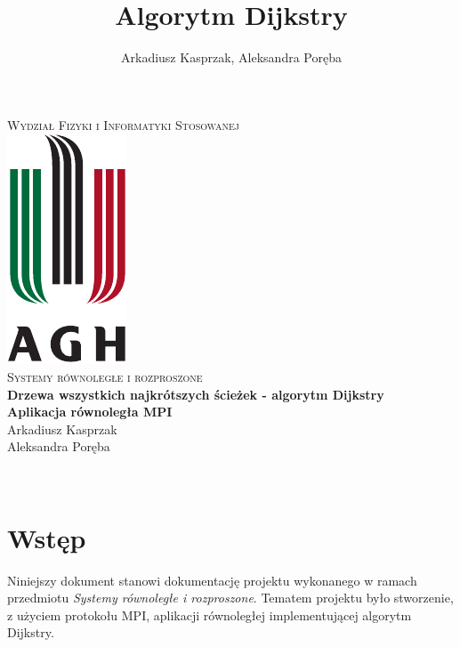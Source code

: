\documentclass[12pt]{article}
\title{Algorytm Dijkstry}
\author{Arkadiusz Kasprzak, Aleksandra Poręba}
\makeatletter
\let\thetitle\@title
\let\theauthor\@author
\makeatother
\begin{document}
\begin{center}
\textsc{\normalsize Wydział Fizyki i Informatyki Stosowanej}\\[2.0cm] 
\includegraphics[scale = 1]{logo.pdf}\\[1cm] 
\textsc{\Large Systemy równoległe i rozproszone}\\[0.4cm] 


{ \huge \bfseries \LARGE{Drzewa wszystkich najkrótszych ścieżek - algorytm Dijkstry} }\\[0.2cm] 
{ \huge \bfseries \LARGE{Aplikacja równoległa MPI} }\\[1cm] 

\flushright \Large Arkadiusz Kasprzak \\ Aleksandra Poręba

\vfill 

\center {\today}\\[2cm] 


\pagebreak 

\end{center}

\setcounter{tocdepth}{2}
\tableofcontents
\pagebreak


\pagestyle{fancy}
\fancyhf{}

\rhead{\theauthor}
\lhead{\thetitle}
\cfoot{\thepage}

\section{Wstęp}
Niniejszy dokument stanowi dokumentację projektu wykonanego w ramach przedmiotu \textit{Systemy równoległe i rozproszone}. Tematem projektu było stworzenie, z użyciem protokołu MPI, aplikacji równoległej implementującej algorytm Dijkstry.
\end{document}
